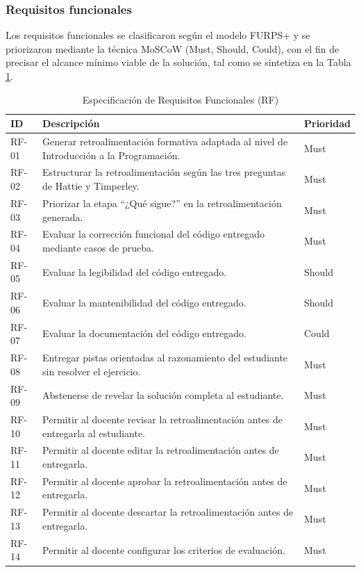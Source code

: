 \documentclass[letterpaper, 10 pt, conference]{ieeeconf}
\begin{document}
\subsubsection{Requisitos funcionales}
Los requisitos funcionales se clasificaron según el modelo FURPS+ y se priorizaron mediante la técnica MoSCoW (Must, Should, Could), con el fin de precisar el alcance mínimo viable de la solución, tal como se sintetiza en la Tabla \ref{tab:req_funcional}.

\begin{table}[ht]
	\centering
	\caption{Especificación de Requisitos Funcionales (RF)}
	\label{tab:req_funcional}
	\begin{tabular}{lp{5.0cm}l}
		\hline
		\textbf{ID} & \textbf{Descripción} & \textbf{Prioridad} \\
		\hline
		RF-01 & Generar retroalimentación formativa adaptada al nivel de Introducción a la Programación. & Must \\
		RF-02 & Estructurar la retroalimentación según las tres preguntas de Hattie y Timperley. & Must \\
		RF-03 & Priorizar la etapa “¿Qué sigue?” en la retroalimentación generada. & Must \\
		RF-04 & Evaluar la corrección funcional del código entregado mediante casos de prueba. & Must \\
		RF-05 & Evaluar la legibilidad del código entregado. & Should \\
		RF-06 & Evaluar la mantenibilidad del código entregado. & Should \\
		RF-07 & Evaluar la documentación del código entregado. & Could \\
		RF-08 & Entregar pistas orientadas al razonamiento del estudiante sin resolver el ejercicio. & Must \\
		RF-09 & Abstenerse de revelar la solución completa al estudiante. & Must \\
		RF-10 & Permitir al docente revisar la retroalimentación antes de entregarla al estudiante. & Must \\
		RF-11 & Permitir al docente editar la retroalimentación antes de entregarla. & Must \\
		RF-12 & Permitir al docente aprobar la retroalimentación antes de entregarla. & Must \\
		RF-13 & Permitir al docente descartar la retroalimentación antes de entregarla. & Must \\
		RF-14 & Permitir al docente configurar los criterios de evaluación. & Must \\

\end{tabular}
\end{table}
\end{document}
